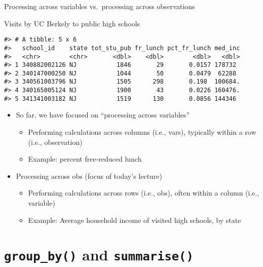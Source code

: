 \documentclass[8pt,ignorenonframetext,dvipsnames]{beamer}
\providecommand{\tightlist}{%
  \setlength{\itemsep}{0pt}\setlength{\parskip}{0pt}}
\begin{document}
\begin{frame}[fragile]{Processing across variables vs.~processing across
observations}

Visits by UC Berkely to public high schools

\begin{verbatim}
#> # A tibble: 5 x 6
#>   school_id    state tot_stu_pub fr_lunch pct_fr_lunch med_inc
#>   <chr>        <chr>       <dbl>    <dbl>        <dbl>   <dbl>
#> 1 340882002126 NJ           1846       29       0.0157 178732 
#> 2 340147000250 NJ           1044       50       0.0479  62288 
#> 3 340561003796 NJ           1505      298       0.198  100684.
#> 4 340165005124 NJ           1900       43       0.0226 160476.
#> 5 341341003182 NJ           1519      130       0.0856 144346
\end{verbatim}

\begin{itemize}
\tightlist
\item
  So far, we have focused on ``processing across variables''

  \begin{itemize}
  \tightlist
  \item
    Performing calculations across columns (i.e., vars), typically
    within a row (i.e., observation)
  \item
    Example: percent free-reduced lunch
  \end{itemize}
\item
  Processing across obs (focus of today's lecture)

  \begin{itemize}
  \tightlist
  \item
    Performing calculations across rows (i.e., obs), often within a
    column (i.e., variable)
  \item
    Example: Average household income of visited high schools, by state
  \end{itemize}
\end{itemize}

\end{frame}

\section{\texorpdfstring{\texttt{group\_by()} and
\texttt{summarise()}}{group\_by() and summarise()}}\label{group_by-and-summarise}
\end{document}
